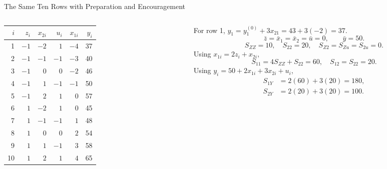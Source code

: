 \documentclass[10pt,aspectratio=169]{beamer}
\begin{document}
\begin{frame}{The Same Ten Rows with Preparation and Encouragement}
\begin{columns}[T,onlytextwidth]
\begin{column}{0.47\textwidth}
\centering
\begin{tabular}{rrrrrr}
\toprule
$i$ & $z_i$ & $x_{2i}$ & $u_i$ & $x_{1i}$ & $y_i$\\
\midrule
1 & $-1$ & $-2$ & $1$ & $-4$ & 37\\
2 & $-1$ & $-1$ & $-1$ & $-3$ & 40\\
3 & $-1$ & $0$ & $0$ & $-2$ & 46\\
4 & $-1$ & $1$ & $-1$ & $-1$ & 50\\
5 & $-1$ & $2$ & $1$ & $0$ & 57\\
6 & $1$ & $-2$ & $1$ & $0$ & 45\\
7 & $1$ & $-1$ & $-1$ & $1$ & 48\\
8 & $1$ & $0$ & $0$ & $2$ & 54\\
9 & $1$ & $1$ & $-1$ & $3$ & 58\\
10 & $1$ & $2$ & $1$ & $4$ & 65\\
\bottomrule
\end{tabular}
\end{column}
\begin{column}{0.50\textwidth}
For row 1, $y_1=y_1^{(0)}+3x_{21}=43+3(-2)=37$.
\[
\bar z=\bar x_1=\bar x_2=\bar u=0,
\qquad \bar y=50.
\]
\[
S_{ZZ}=10,\quad S_{22}=20,\quad
S_{Z2}=S_{Zu}=S_{2u}=0.
\]
Using $x_{1i}=2z_i+x_{2i}$,
\[
S_{11}=4S_{ZZ}+S_{22}=60,
\quad S_{12}=S_{22}=20.
\]
Using $y_i=50+2x_{1i}+3x_{2i}+u_i$,
\[
\begin{aligned}
S_{1Y}&=2(60)+3(20)=180,\\
S_{2Y}&=2(20)+3(20)=100.
\end{aligned}
\]
\end{column}
\end{columns}
\end{frame}
\end{document}
